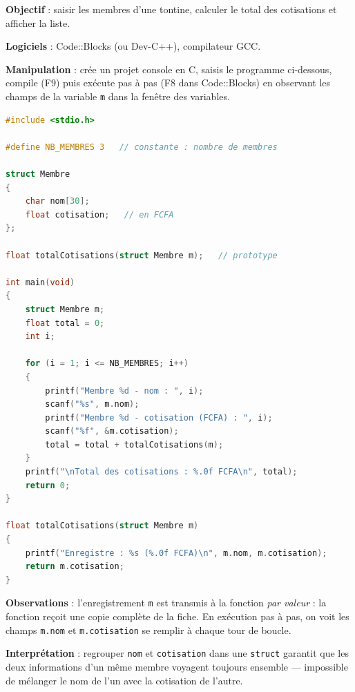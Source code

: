 \documentclass[11pt]{article}
\begin{document}
\begin{experience}
\textbf{Objectif} : saisir les membres d'une tontine, calculer le total des cotisations et afficher la liste.

\textbf{Logiciels} : Code::Blocks (ou Dev-C++), compilateur GCC.

\textbf{Manipulation} : crée un projet console en C, saisis le programme ci-dessous, compile (F9) puis exécute pas à pas (F8 dans Code::Blocks) en observant les champs de la variable \texttt{m} dans la fenêtre des variables.
\begin{lstlisting}[language=C]
#include <stdio.h>

#define NB_MEMBRES 3   // constante : nombre de membres

struct Membre
{
    char nom[30];
    float cotisation;   // en FCFA
};

float totalCotisations(struct Membre m);   // prototype

int main(void)
{
    struct Membre m;
    float total = 0;
    int i;

    for (i = 1; i <= NB_MEMBRES; i++)
    {
        printf("Membre %d - nom : ", i);
        scanf("%s", m.nom);
        printf("Membre %d - cotisation (FCFA) : ", i);
        scanf("%f", &m.cotisation);
        total = total + totalCotisations(m);
    }
    printf("\nTotal des cotisations : %.0f FCFA\n", total);
    return 0;
}

float totalCotisations(struct Membre m)
{
    printf("Enregistre : %s (%.0f FCFA)\n", m.nom, m.cotisation);
    return m.cotisation;
}
\end{lstlisting}
\textbf{Observations} : l'enregistrement \texttt{m} est transmis à la fonction \emph{par valeur} : la fonction reçoit une copie complète de la fiche. En exécution pas à pas, on voit les champs \texttt{m.nom} et \texttt{m.cotisation} se remplir à chaque tour de boucle.

\textbf{Interprétation} : regrouper \texttt{nom} et \texttt{cotisation} dans une \texttt{struct} garantit que les deux informations d'un même membre voyagent toujours ensemble — impossible de mélanger le nom de l'un avec la cotisation de l'autre.
\end{experience}
\end{document}
